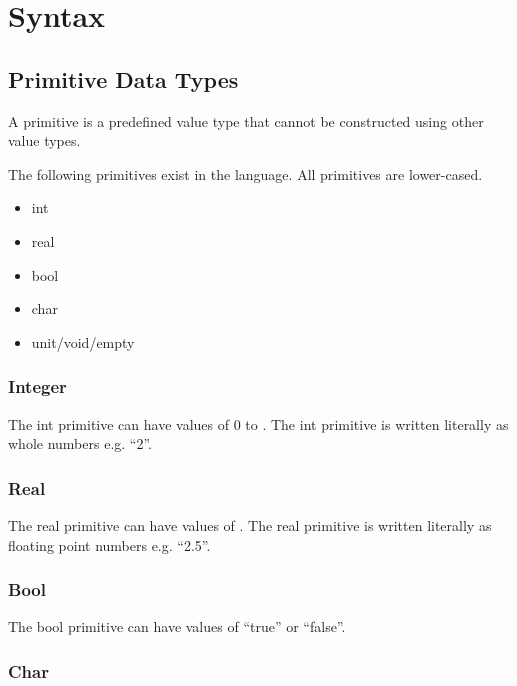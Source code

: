 \section{Syntax}
\label{sec:syntax}

\subsection{Primitive Data Types}
\label{subsec:primitives}

A primitive is a predefined value type that cannot be constructed using other value types.

The following primitives exist in the language. All primitives are lower-cased.

\begin{itemize}
  \item int
  \item real
  \item bool
  \item char
  \item unit/void/empty 
\end{itemize}

\subsubsection{Integer}
\label{subsubsec:int}

The int primitive can have values of 0 to . The int primitive is written literally as whole numbers e.g. \enquote{2}.

\subsubsection{Real}
\label{subsubsec:real}

The real primitive can have values of . The real primitive is written literally as floating point numbers e.g. \enquote{2.5}.

\subsubsection{Bool}
\label{subsubsec:bool}

The bool primitive can have values of \enquote{true} or \enquote{false}.

\subsubsection{Char}
\label{sec:char}

